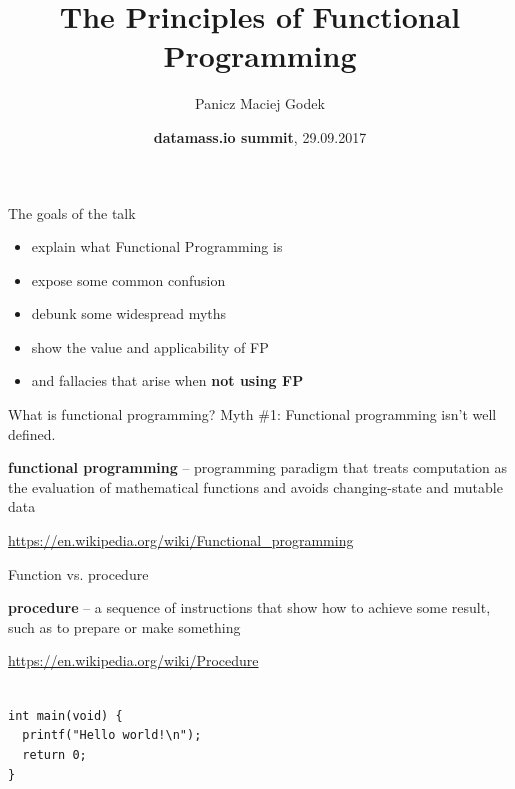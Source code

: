 \documentclass{beamer}
\title{\textbf{The Principles of Functional Programming}}
\author{Panicz Maciej Godek}
\institute{
  \tiny{\href{mailto:godek.maciek@gmail.com}{\textbf{godek.maciek@gmail.com}}} \\
  \normalsize{\url{https://github.com/panicz/writings/tree/master/talks/datamass}}
}
\date{\textbf{datamass.io summit}, 29.09.2017}
\begin{document}
\begin{frame}
  \titlepage
\end{frame}

\begin{frame}{The goals of the talk}
  \begin{itemize} \pause
    \item explain what Functional Programming is \pause
    \item expose some common confusion \pause
    \item debunk some widespread myths \pause
    \item show the value and applicability of FP \pause
    \item and fallacies that arise when \textbf{not using FP}
  \end{itemize}
\end{frame}


\begin{frame}{What is functional programming?} \pause
  Myth \#1: Functional programming isn't well defined. \pause

  \begin{displayquote}
    \textbf{functional programming} -- programming paradigm that
    treats computation as the evaluation of mathematical functions
    and avoids changing-state and mutable data
  \end{displayquote}

  \begin{flushright}
  {\footnotesize \url{https://en.wikipedia.org/wiki/Functional_programming}}
  \end{flushright}
  
\end{frame}

\begin{frame}{Function vs. procedure} \pause
  
  \begin{displayquote}
    \textbf{procedure} -- a sequence of instructions that show
    how to achieve some result, such as to prepare
    or make something
  \end{displayquote}
  \begin{flushright}
    {\footnotesize \url{https://en.wikipedia.org/wiki/Procedure}} \\ \pause
  \end{flushright}
  \ \\
  \texttt{int main(void) \{ \\
    \ \ printf("Hello world!\textbackslash{}n"); \\
    \ \ return 0;\\
    \}}
  
\end{frame}
\end{document}
